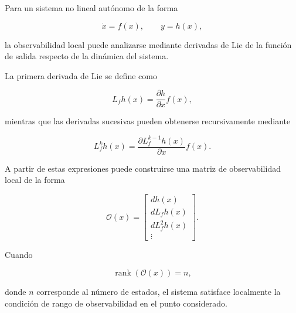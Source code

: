 %

Para un sistema no lineal autónomo de la forma

\begin{equation}
\dot{x}=f(x),
\qquad
y=h(x),
\end{equation}

la observabilidad local puede analizarse mediante derivadas de Lie de la 
función de salida respecto de la dinámica del sistema.

La primera derivada de Lie se define como

\begin{equation}
L_fh(x)
=
\frac{\partial h}{\partial x}f(x),
\end{equation}

mientras que las derivadas sucesivas pueden obtenerse recursivamente mediante

\begin{equation}
L_f^{k}h(x)
=
\frac{\partial L_f^{k-1}h(x)}{\partial x}f(x).
\end{equation}

A partir de estas expresiones puede construirse una matriz de observabilidad 
local de la forma

\begin{equation}
\mathcal{O}(x)
=
\begin{bmatrix}
dh(x)\\
dL_fh(x)\\
dL_f^2h(x)\\
\vdots
\end{bmatrix}.
\end{equation}

Cuando

\begin{equation}
\operatorname{rank}\left(\mathcal{O}(x)\right)=n,
\end{equation}

donde $n$ corresponde al número de estados, el sistema satisface localmente 
la condición de rango de observabilidad en el punto considerado.

%
%


